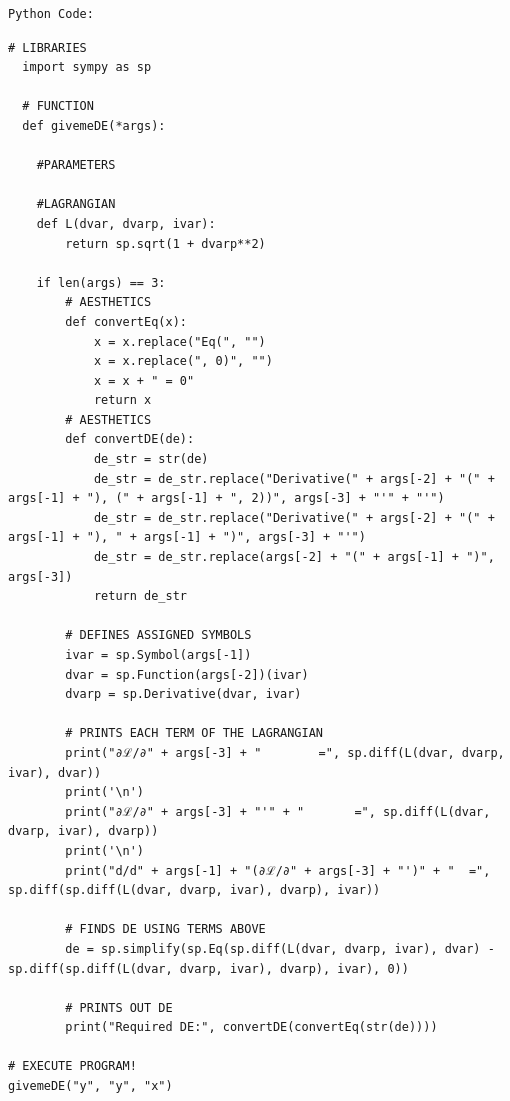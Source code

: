 \documentclass[hidelinks, 11pt]{article}
\begin{document}
  


\begin{lstlisting}[frame = none]
  Python Code:
\end{lstlisting}

\begin{lstlisting}[frame = left]
  # LIBRARIES
  import sympy as sp

  # FUNCTION
  def givemeDE(*args):
    
    #PARAMETERS

    #LAGRANGIAN
    def L(dvar, dvarp, ivar):
        return sp.sqrt(1 + dvarp**2)
    
    if len(args) == 3:
        # AESTHETICS
        def convertEq(x):
            x = x.replace("Eq(", "")
            x = x.replace(", 0)", "")
            x = x + " = 0"
            return x
        # AESTHETICS
        def convertDE(de):
            de_str = str(de)
            de_str = de_str.replace("Derivative(" + args[-2] + "(" + args[-1] + "), (" + args[-1] + ", 2))", args[-3] + "'" + "'")
            de_str = de_str.replace("Derivative(" + args[-2] + "(" + args[-1] + "), " + args[-1] + ")", args[-3] + "'")
            de_str = de_str.replace(args[-2] + "(" + args[-1] + ")", args[-3])
            return de_str

        # DEFINES ASSIGNED SYMBOLS
        ivar = sp.Symbol(args[-1])
        dvar = sp.Function(args[-2])(ivar)
        dvarp = sp.Derivative(dvar, ivar)

        # PRINTS EACH TERM OF THE LAGRANGIAN
        print("∂ℒ/∂" + args[-3] + "        =", sp.diff(L(dvar, dvarp, ivar), dvar))
        print('\n')         
        print("∂ℒ/∂" + args[-3] + "'" + "       =", sp.diff(L(dvar, dvarp, ivar), dvarp))
        print('\n')         
        print("d/d" + args[-1] + "(∂ℒ/∂" + args[-3] + "')" + "  =", sp.diff(sp.diff(L(dvar, dvarp, ivar), dvarp), ivar))

        # FINDS DE USING TERMS ABOVE
        de = sp.simplify(sp.Eq(sp.diff(L(dvar, dvarp, ivar), dvar) - sp.diff(sp.diff(L(dvar, dvarp, ivar), dvarp), ivar), 0))

        # PRINTS OUT DE
        print("Required DE:", convertDE(convertEq(str(de))))

# EXECUTE PROGRAM!
givemeDE("y", "y", "x")
\end{lstlisting}
\end{document}
